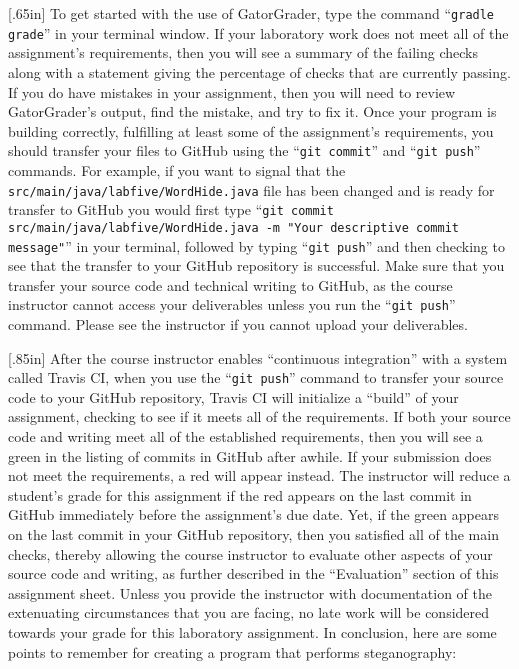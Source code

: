 \documentclass[11pt]{article}
\newcommand{\mainprogramsource}{\lstinline{src/main/java/labfive/WordHide.java}}
\newcommand{\gatorgraderstart}{\command{gradle grade}}
\newcommand{\gitcommit}{\command{git commit}}
\newcommand{\gitpush}{\command{git push}}
\newcommand{\gitcommitmainprogram}{\command{git commit src/main/java/labfive/WordHide.java -m "Your
descriptive commit message"}}
\newcommand{\command}[1]{``\lstinline{#1}''}
\newcommand{\step}[1]{``{#1}''}
\newcommand{\caution}[1]{\null\hfill\LARGE{\faWarning{}}\newline\scriptsize{\em{#1}}}
\newcommand{\checkmark}{\ding{51}}
\newcommand{\naughtmark}{\ding{55}}
\begin{document}
\marginnote{\caution{Transfer to GitHub}}[.65in] To get started with the use of
GatorGrader, type the command \gatorgraderstart{} in your terminal window. If
your laboratory work does not meet all of the assignment's requirements, then
you will see a summary of the failing checks along with a statement giving the
percentage of checks that are currently passing. If you do have mistakes in your
assignment, then you will need to review GatorGrader's output, find the mistake,
and try to fix it. Once your program is building correctly, fulfilling at least
some of the assignment's requirements, you should transfer your files to GitHub
using the \gitcommit{} and \gitpush{} commands. For example, if you want to
signal that the \mainprogramsource{} file has been changed and is ready for
transfer to GitHub you would first type \gitcommitmainprogram{} in your
terminal, followed by typing \gitpush{} and then checking to see that the
transfer to your GitHub repository is successful. Make sure that you transfer
your source code and technical writing to GitHub, as the course instructor
cannot access your deliverables unless you run the \gitpush{} command. Please
see the instructor if you cannot upload your deliverables.

\marginnote{\caution{Review all checks}}[.85in] After the course instructor
enables \step{continuous integration} with a system called Travis CI, when you
use the \gitpush{} command to transfer your source code to your GitHub
repository, Travis CI will initialize a \step{build} of your assignment,
checking to see if it meets all of the requirements. If both your source code
and writing meet all of the established requirements, then you will see a green
\checkmark{} in the listing of commits in GitHub after awhile. If your
submission does not meet the requirements, a red \naughtmark{} will appear
instead. The instructor will reduce a student's grade for this assignment if the
red \naughtmark{} appears on the last commit in GitHub immediately before the
assignment's due date. Yet, if the green \checkmark{} appears on the last commit
in your GitHub repository, then you satisfied all of the main checks, thereby
allowing the course instructor to evaluate other aspects of your source code and
writing, as further described in the \step{Evaluation} section of this
assignment sheet. Unless you provide the instructor with documentation of the
extenuating circumstances that you are facing, no late work will be considered
towards your grade for this laboratory assignment. In conclusion, here are some
points to remember for creating a program that performs steganography:
\end{document}
